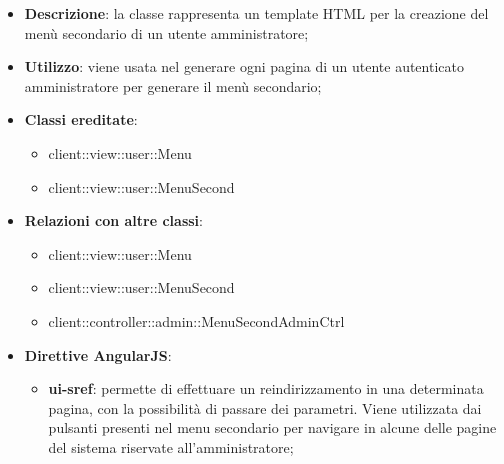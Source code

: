 			\begin{itemize}
				\item \textbf{Descrizione}: la classe rappresenta un template HTML per la creazione del menù secondario di un utente amministratore;
				\item \textbf{Utilizzo}: viene usata nel generare ogni pagina di un utente autenticato amministratore per generare il menù secondario;
				\item \textbf{Classi ereditate}:
					\begin{itemize}
						\item client::view::user::Menu
						\item client::view::user::MenuSecond
					\end{itemize}
				\item \textbf{Relazioni con altre classi}:
					\begin{itemize}
						\item client::view::user::Menu
						\item client::view::user::MenuSecond
						\item client::controller::admin::MenuSecondAdminCtrl
					\end{itemize}
				\item \textbf{Direttive AngularJS}:
					\begin{itemize}
						\item \textbf{ui-sref}: permette di effettuare un reindirizzamento in una determinata pagina, con la possibilità di passare dei parametri. Viene utilizzata dai pulsanti presenti nel menu secondario per navigare in alcune delle pagine del sistema riservate all'amministratore;
					\end{itemize}
			\end{itemize}

